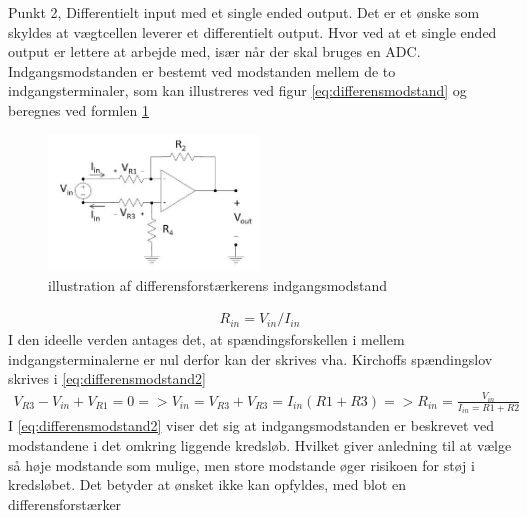 Punkt 2, Differentielt input med et single ended output. Det er et ønske som skyldes at vægtcellen leverer et differentielt output. Hvor ved at et single ended output er lettere at arbejde med, især når der skal bruges en ADC. Indgangsmodstanden er bestemt ved modstanden mellem de to indgangsterminaler, som kan illustreres ved figur \ref{eq:differensmodstand} og beregnes ved formlen \ref{fig:differensmodstand}
\begin{figure}[H]
	\centering
	\includegraphics[width=0.5\textwidth]{billeder/Hardware/differensmodstand.JPG}
	\caption{illustration af differensforstærkerens indgangsmodstand}
	\label{fig:differensmodstand}
\end{figure}
\begin{align}
 R_{in} =V_{in}/I_{in}
 \label{eq:differensmodstand}
 \end{align}
I den ideelle verden antages det, at spændingsforskellen i mellem indgangsterminalerne er nul derfor kan der skrives vha. Kirchoffs spændingslov skrives i \ref{eq:differensmodstand2}
\begin{align}
 V_{R3}-V_{in}+V_{R1}=0=>V_{in}=V_{R3}+V_{R3}=I_{in}(R1+R3)=>R_{in}=\frac{V_{in}}{I_{in}=R1+R2}
 \label{eq:differensmodstand2}
 \end{align}
 I \ref{eq:differensmodstand2} viser det sig at indgangsmodstanden er beskrevet ved modstandene i det omkring liggende kredsløb. Hvilket giver anledning til at vælge så høje modstande som mulige, men store modstande øger risikoen for støj i kredsløbet. Det betyder at ønsket ikke kan opfyldes, med blot en differensforstærker


